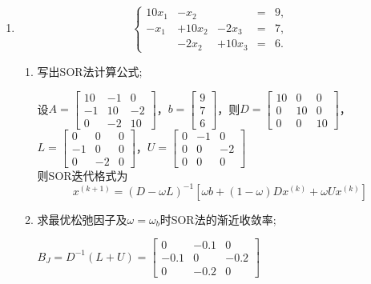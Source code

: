\documentclass[a4paper]{article}
\begin{document}
\begin{enumerate}
  \item 
  $$
  \left\{
  \begin{array}{rrrrr}
  10x_1 & - x_2 &              & = & 9,\\
  - x_1 & + 10x_2 & - 2x_3 & = & 7,\\
        & - 2x_2 & + 10x_3 & = & 6.
  \end{array}
  \right.
  $$
  \begin{enumerate}[label=(\arabic*)]
    \item 写出SOR法计算公式;
    \begin{solution}
      设$A=\begin{bmatrix}
      10 & -1 & 0 \\
      -1 & 10 & -2 \\
      0 & -2 & 10
      \end{bmatrix}$，$b=\begin{bmatrix}
      9 \\
      7 \\
      6
      \end{bmatrix}$，则$D=\begin{bmatrix}
      10 & 0 & 0 \\
      0 & 10 & 0 \\
      0 & 0 & 10
      \end{bmatrix}$，$L=\begin{bmatrix}
      0 & 0 & 0 \\
      -1 & 0 & 0 \\
      0 & -2 & 0
      \end{bmatrix}$，$U=\begin{bmatrix}
      0 & -1 & 0 \\
      0 & 0 & -2 \\
      0 & 0 & 0
      \end{bmatrix}$\\
      则SOR迭代格式为
      $$x^{(k+1)}=\left(D-\omega L\right)^{-1}\left[\omega b+\left(1-\omega\right)Dx^{(k)}+\omega Ux^{(k)}\right]$$
    \end{solution}
    \item 求最优松弛因子及$\omega=\omega_b$时SOR法的渐近收敛率;
    \begin{solution}
      $B_J=D^{-1}(L+U)=\begin{bmatrix}
      0 & -0.1 & 0 \\
      -0.1 & 0 & -0.2 \\
      0 & -0.2 & 0
      \end{bmatrix}$\\

\end{solution}
\end{enumerate}
\end{enumerate}
\end{document}
